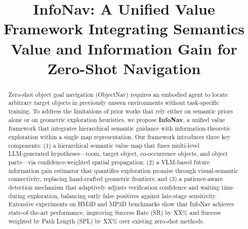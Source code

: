 \documentclass[conference]{IEEEtran}
\begin{document}
\title{InfoNav: A Unified Value Framework Integrating Semantics Value and Information Gain for Zero-Shot Navigation\\
}

\author{

}

\maketitle

\begin{abstract}
Zero-shot object goal navigation (ObjectNav) requires an embodied agent to locate arbitrary target objects in previously unseen environments without task-specific training. To address the limitations of prior works that rely either on semantic priors alone or on geometric exploration heuristics, we propose \textbf{InfoNav}, a unified value framework that integrates hierarchical semantic guidance with information‑theoretic exploration within a single map representation. Our framework introduces three key components: (1) a hierarchical semantic value map that fuses multi‑level LLM‑generated hypotheses—room, target object, co‑occurrence objects, and object parts—via confidence‑weighted spatial propagation; (2) a VLM‑based future information gain estimator that quantifies exploration promise through visual‑semantic connectivity, replacing hand‑crafted geometric frontiers; and (3) a patience‑aware detection mechanism that adaptively adjusts verification confidence and waiting time during exploration, balancing early false positives against late‑stage sensitivity. Extensive experiments on HM3D and MP3D benchmarks show that InfoNav achieves state‑of‑the‑art performance, improving Success Rate (SR) by XX\% and Success weighted by Path Length (SPL) by XX\% over existing zero‑shot methods.
\end{abstract}
\end{document}
